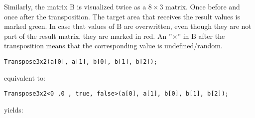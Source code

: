 Similarly, the matrix $\textrm{B}$ is visualized twice as a $8 \times 3$ matrix.
Once before and once after the transposition.
The target area that receives the result values is marked green.
In case that values of $\textrm{B}$ are overwritten, even though they are not part of the result matrix, they are marked in red.
An ''$\times$'' in $\textrm{B}$ after the transposition means that the corresponding value is undefined/random.


\vspace{1cm}
\begin{minipage}{\linewidth}
\begin{verbatim}
Transpose3x2(a[0], a[1], b[0], b[1], b[2]);
\end{verbatim}
equivalent to: 
\begin{verbatim}
Transpose3x2<0 ,0 , true, false>(a[0], a[1], b[0], b[1], b[2]);
\end{verbatim}
yields:


\end{minipage}
